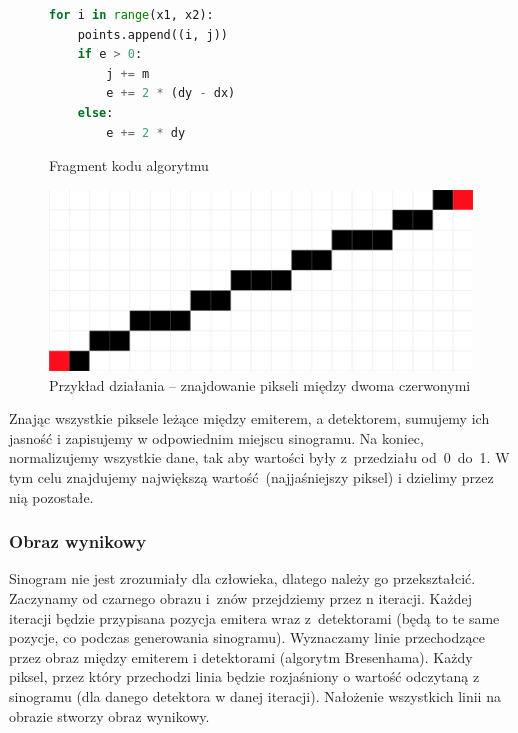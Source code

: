 \documentclass[polish,polish,a4paper]{article}
\begin{document}
				\begin{figure}[!h]
					\centering
					\begin{minipage}{0.4\linewidth}
						\begin{lstlisting}[language=Python, frame=single]
for i in range(x1, x2):
    points.append((i, j))
    if e > 0:
        j += m
        e += 2 * (dy - dx)
    else:
        e += 2 * dy
						\end{lstlisting}
						\caption{Fragment kodu algorytmu}
					\end{minipage}
					\hfill
					\begin{minipage}{0.45\linewidth}
						\includegraphics[width=\textwidth]{img/bresenham.png}
						\caption{Przykład działania -- znajdowanie pikseli między dwoma czerwonymi}
					\end{minipage}
				\end{figure}
				
				Znając wszystkie piksele leżące między emiterem, a detektorem, 
				sumujemy ich jasność i zapisujemy w odpowiednim miejscu sinogramu.
				Na koniec, normalizujemy wszystkie dane, tak aby wartości były z~przedziału od~0~do~1.
				 W tym celu znajdujemy największą wartość (najjaśniejszy piksel) i dzielimy przez nią pozostałe.
				
				\subsubsection{Obraz wynikowy}
					Sinogram nie jest zrozumiały dla człowieka, 
					dlatego należy go przekształcić.
					Zaczynamy od czarnego obrazu i~znów przejdziemy przez n iteracji.
					Każdej iteracji będzie przypisana pozycja emitera wraz z~detektorami 
					(będą to te same pozycje, co podczas generowania sinogramu).
					Wyznaczamy linie przechodzące przez obraz między emiterem i detektorami (algorytm Bresenhama).
					Każdy piksel, przez który przechodzi linia będzie rozjaśniony o wartość odczytaną z sinogramu 
					(dla danego detektora w danej iteracji). 
					Nałożenie wszystkich linii na obrazie stworzy obraz wynikowy.
				
\end{document}
